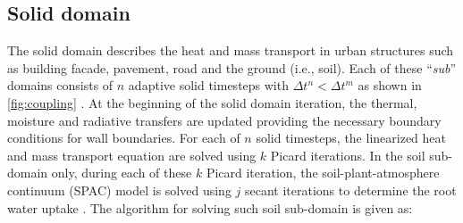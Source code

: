 \subsection{Solid domain}

The solid domain describes the heat and mass transport in urban structures such as building facade, pavement, road and the ground (i.e., soil). Each of these ``\textit{sub}'' domains consists of $n$ adaptive solid timesteps with $\Delta t^n < \Delta t^m$ as shown in \cref{fig:coupling} \citep{Kubilay2018,Janssen2002}. At the beginning of the solid domain iteration, the thermal, moisture and radiative transfers are updated providing the necessary boundary conditions for wall boundaries. For each of $n$ solid timesteps, the linearized heat and mass transport equation are solved using $k$ Picard iterations. In the soil sub-domain only, during each of these $k$ Picard iteration, the soil-plant-atmosphere continuum (SPAC) model is solved using $j$ secant iterations to determine the root water uptake \citep{Manoli2014}. The algorithm for solving such soil sub-domain is given as:
